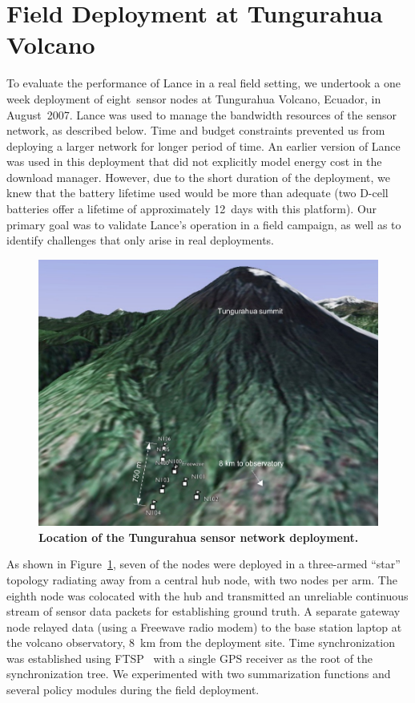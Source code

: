 \section{Field Deployment at Tungurahua Volcano}
\label{lance-sec-deployment}

To evaluate the performance of Lance in a real field setting, we undertook a
one week deployment of eight~sensor nodes at Tungurahua Volcano, Ecuador, in
August~2007. Lance was used to manage the bandwidth resources of the sensor
network, as described below. Time and budget constraints prevented us from
deploying a larger network for longer period of time. An earlier version of
Lance was used in this deployment that did not explicitly model energy cost
in the download manager. However, due to the short duration of the
deployment, we knew that the battery lifetime used would be more than
adequate (two D-cell batteries offer a lifetime of approximately 12~days with
this platform). Our primary goal was to validate Lance's operation in a field
campaign, as well as to identify challenges that only arise in real
deployments.

\begin{figure}[t]
\begin{center}
\includegraphics[width=0.7\hsize]{./4-lance/figs/map.pdf}
\end{center}

\caption{\textbf{Location of the Tungurahua sensor network deployment.}}

\label{lance-fig-map}
\end{figure}

As shown in Figure~\ref{lance-fig-map}, seven of the nodes were deployed in a
three-armed ``star'' topology radiating away from a central hub node, with
two nodes per arm. The eighth node was colocated with the hub and transmitted
an unreliable continuous stream of sensor data packets for establishing
ground truth. A separate gateway node relayed data (using a Freewave radio
modem) to the base station laptop at the volcano observatory, 8~km from the
deployment site. Time synchronization was established using FTSP~\cite{ftsp}
with a single GPS receiver as the root of the synchronization tree. We
experimented with two summarization functions and several policy modules
during the field deployment.

